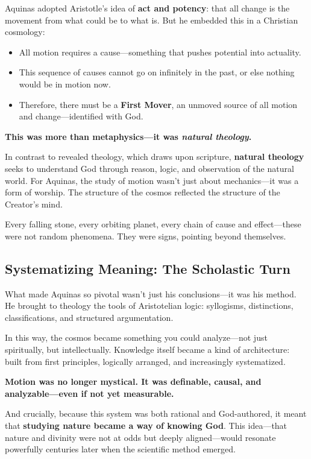 Aquinas adopted Aristotle’s idea of \textbf{act and potency}: that all change is the movement from what could be to what is. But he embedded this in a Christian cosmology:

\begin{itemize}
    \item All motion requires a cause—something that pushes potential into actuality.
    \item This sequence of causes cannot go on infinitely in the past, or else nothing would be in motion now.
    \item Therefore, there must be a \textbf{First Mover}, an unmoved source of all motion and change—identified with God.
\end{itemize}

\textbf{This was more than metaphysics—it was \textit{natural theology}.}

In contrast to revealed theology, which draws upon scripture, \textbf{natural theology} seeks to understand God through reason, logic, and observation of the natural world. For Aquinas, the study of motion wasn’t just about mechanics—it was a form of worship. The structure of the cosmos reflected the structure of the Creator’s mind.

Every falling stone, every orbiting planet, every chain of cause and effect—these were not random phenomena. They were signs, pointing beyond themselves.

\subsection{Systematizing Meaning: The Scholastic Turn}

What made Aquinas so pivotal wasn’t just his conclusions—it was his method. He brought to theology the tools of Aristotelian logic: syllogisms, distinctions, classifications, and structured argumentation.  

In this way, the cosmos became something you could analyze—not just spiritually, but intellectually. Knowledge itself became a kind of architecture: built from first principles, logically arranged, and increasingly systematized.

\textbf{Motion was no longer mystical. It was definable, causal, and analyzable—even if not yet measurable.}

And crucially, because this system was both rational and God-authored, it meant that \textbf{studying nature became a way of knowing God}. This idea—that nature and divinity were not at odds but deeply aligned—would resonate powerfully centuries later when the scientific method emerged.

